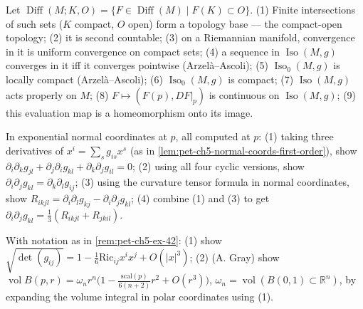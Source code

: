\begin{remark}
  \label{rem:pet-ch5-ex-41}
  Let $\operatorname{Diff}(M;K,O)=\{F\in\operatorname{Diff}(M)\mid F(K)\subset O\}$.
  (1) Finite intersections of such sets ($K$ compact, $O$ open) form a topology
  base — the compact-open topology; (2) it is second countable; (3) on a
  Riemannian manifold, convergence in it is uniform convergence on compact sets;
  (4) a sequence in $\operatorname{Iso}(M,g)$ converges in it iff it converges
  pointwise (Arzelà–Ascoli); (5) $\operatorname{Iso}_0(M,g)$ is locally compact
  (Arzelà–Ascoli); (6) $\operatorname{Iso}_0(M,g)$ is compact; (7)
  $\operatorname{Iso}(M,g)$ acts properly on $M$; (8) $F\mapsto(F(p),DF|_p)$ is
  continuous on $\operatorname{Iso}(M,g)$; (9) this evaluation map is a
  homeomorphism onto its image.
\end{remark}

\begin{remark}
  \label{rem:pet-ch5-ex-42}
  In exponential normal coordinates at $p$, all computed at $p$: (1) taking three
  derivatives of $x^i=\sum_sg_{is}x^s$ (as in
  \cref{lem:pet-ch5-normal-coords-first-order}), show
  $\partial_i\partial_kg_{jl}+\partial_j\partial_ig_{kl}+\partial_k\partial_jg_{il}=0$;
  (2) using all four cyclic versions, show
  $\partial_i\partial_jg_{kl}=\partial_k\partial_lg_{ij}$; (3) using the curvature
  tensor formula in normal coordinates, show
  $R_{ikjl}=\partial_i\partial_lg_{kj}-\partial_i\partial_jg_{kl}$; (4) combine (1)
  and (3) to get $\partial_i\partial_jg_{kl}=\tfrac13(R_{ikjl}+R_{jkil})$.
\end{remark}

\begin{remark}
  \label{rem:pet-ch5-ex-43}
  With notation as in \cref{rem:pet-ch5-ex-42}: (1) show
  $\sqrt{\det(g_{ij})}=1-\tfrac16\mathrm{Ric}_{ij}x^ix^j+O(|x|^3)$; (2) (A. Gray)
  show $\operatorname{vol}B(p,r)=\omega_nr^n\big(1-\tfrac{\mathrm{scal}(p)}{6(n+2)}r^2
  +O(r^3)\big)$, $\omega_n=\operatorname{vol}(B(0,1)\subset\mathbb R^n)$, by
  expanding the volume integral in polar coordinates using (1).
\end{remark}
